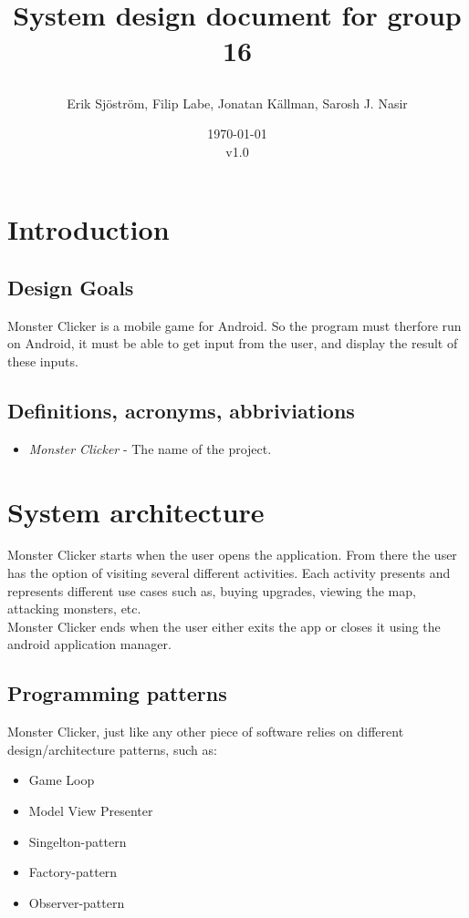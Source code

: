 \documentclass{article}
\title{
    System design document for group 16
    \author{Erik Sjöström,
            Filip Labe,
            Jonatan Källman,
            Sarosh J. Nasir}
    \date{\today \\v1.0}         
}
\begin{document}
\maketitle

\section{Introduction}

\subsection{Design Goals}

Monster Clicker is a mobile game for Android. So the program must therfore run on Android, it must be able to get input from the user, and display the result of these inputs. 

\subsection{Definitions, acronyms, abbriviations}
\begin{itemize}
    \item \emph{Monster Clicker} - The name of the project.
\end{itemize}

\section{System architecture}

Monster Clicker starts when the user opens the application. From there the user has
the option of visiting several different activities. Each activity presents and
represents different use cases such as, buying upgrades, viewing the map, attacking monsters, etc. \\ \noindent
Monster Clicker ends when the user either exits the app or closes it using the android application manager.

\subsection{Programming patterns}
Monster Clicker, just like any other piece of software relies on different design/architecture patterns, such as:
\begin{itemize}
    \item Game Loop \cite{game-loop}
    \item Model View Presenter \cite{MVP}
    \item Singelton-pattern
    \item Factory-pattern
    \item Observer-pattern
\end{itemize}
\end{document}
